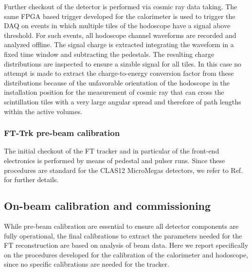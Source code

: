 Further checkout of the detector is performed via cosmic ray data taking. The same FPGA based trigger developed for the calorimeter is used to trigger the DAQ on events in which multiple tiles of the hodoscope have a signal above threshold. For such events, all hodoscope channel waveforms are recorded and analyzed offline. The signal charge is extracted integrating the waveform in a fixed time window and subtracting the pedestals. The resulting charge distributions are inspected to ensure a sizable signal for all tiles. In this case no attempt is made to extract the charge-to-energy conversion factor from these distributions because of the unfavorable orientation of the hodoscope in the installation position for the measurement of cosmic ray that can cross the scintillation tiles with a very large angular spread and therefore of path lengths within the active volumes.

\subsubsection{FT-Trk pre-beam calibration}
The initial checkout of the FT tracker and in particular of the front-end electronics is performed by means of pedestal and pulser runs. Since these procedures are standard for the CLAS12 MicroMegas detectors, we refer to Ref. \cite{mm} for further details.

\subsection{On-beam calibration and commissioning}
While pre-beam calibration are essential to ensure all detector components are fully operational, the final calibrations to extract the parameters needed for the FT reconstruction are based on analysis of beam data. Here we report specifically on the procedures developed for the calibration of the calorimeter and hodoscope, since no specific calibrations are needed for the tracker.

